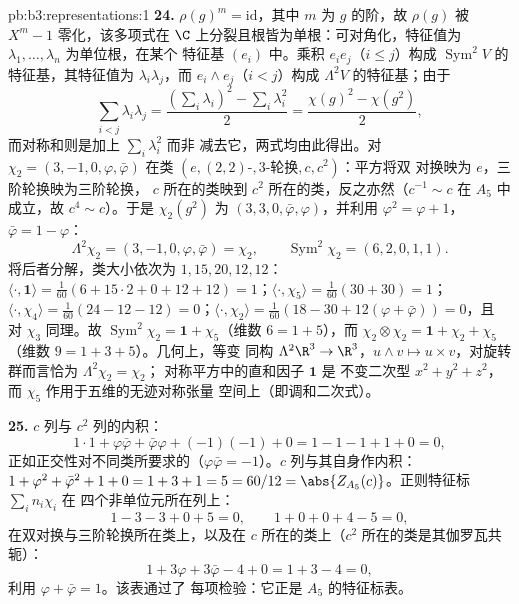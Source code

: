 \begin{solution}{pb:b3:representations:1}
\textbf{24.} $\rho(g)^m = \mathrm{id}$，其中 $m$ 为
$g$ 的阶，故 $\rho(g)$ 被 $X^m - 1$ 零化，该多项式在
$\C$ 上分裂且根皆为单根：可对角化，特征值为
$\lambda_1, \dots, \lambda_n$ 为单位根，在某个
特征基 $(e_i)$ 中。乘积 $e_ie_j$（$i \leq j$）构成
$\operatorname{Sym}^2V$ 的特征基，其特征值为
$\lambda_i\lambda_j$，而 $e_i \wedge e_j$（$i < j$）构成
$\Lambda^2V$ 的特征基；由于
\[
\sum_{i<j}\lambda_i\lambda_j
= \frac{(\sum_i\lambda_i)^2 - \sum_i\lambda_i^2}2
= \frac{\chi(g)^2 - \chi(g^2)}2,
\]
而对称和则是加上 $\sum_i\lambda_i^2$ 而非
减去它，两式均由此得出。对 $\chi_2 = (3, -1,
0, \varphi, \bar\varphi)$ 在类 $(e, (2,2)\text{-},
3\text{-轮换}, c, c^2)$：平方将双
对换映为 $e$，三阶轮换映为三阶轮换，
$c$ 所在的类映到 $c^2$ 所在的类，反之亦然（$c^{-1} \sim
c$ 在 $A_5$ 中成立，故 $c^4 \sim c$）。于是 $\chi_2(g^2)$ 为 $(3,
3, 0, \bar\varphi, \varphi)$，并利用 $\varphi^2 = \varphi
+ 1$，$\bar\varphi = 1 - \varphi$：
\[
\Lambda^2\chi_2 = (3, -1, 0, \varphi, \bar\varphi) = \chi_2,
\qquad
\operatorname{Sym}^2\chi_2 = (6, 2, 0, 1, 1) .
\]
将后者分解，类大小依次为 $1, 15, 20, 12,
12$：$\langle\cdot, \mathbf 1\rangle = \frac1{60}(6 +
15\cdot2 + 0 + 12 + 12) = 1$；$\langle\cdot, \chi_5\rangle =
\frac1{60}(30 + 30) = 1$；$\langle\cdot, \chi_4\rangle =
\frac1{60}(24 - 12 - 12) = 0$；$\langle\cdot, \chi_2\rangle =
\frac1{60}(18 - 30 + 12(\varphi + \bar\varphi)) = 0$，且
对 $\chi_3$ 同理。故 $\operatorname{Sym}^2\chi_2 =
\mathbf 1 + \chi_5$（维数 $6 = 1 + 5$），而
$\chi_2\otimes\chi_2 = \mathbf 1 + \chi_2 + \chi_5$
（维数 $9 = 1 + 3 + 5$）。几何上，等变
同构 $\Lambda^2\R^3 \to \R^3$，$u \wedge v \mapsto u
\times v$，对旋转群而言恰为 $\Lambda^2\chi_2 = \chi_2$；
对称平方中的直和因子 $\mathbf 1$ 是
不变二次型 $x^2 + y^2 + z^2$，而
$\chi_5$ 作用于五维的无迹对称张量
空间上（即调和二次式）。

\textbf{25.} $c$ 列与 $c^2$ 列的内积：
\[
1\cdot1 + \varphi\bar\varphi + \bar\varphi\varphi +
(-1)(-1) + 0 = 1 - 1 - 1 + 1 + 0 = 0,
\]
正如正交性对不同类所要求的（$\varphi
\bar\varphi = -1$）。$c$ 列与其自身作内积：$1 +
\varphi^2 + \bar\varphi^2 + 1 + 0 = 1 + 3 + 1 = 5 = 60/12 =
\abs{Z_{A_5}(c)}$。正则特征标 $\sum_in_i\chi_i$ 在
四个非单位元所在列上：
\[
1 - 3 - 3 + 0 + 5 = 0, \qquad
1 + 0 + 0 + 4 - 5 = 0,
\]
在双对换与三阶轮换所在类上，以及在
$c$ 所在的类上（$c^2$ 所在的类是其伽罗瓦共轭）：
\[
1 + 3\varphi + 3\bar\varphi - 4 + 0 = 1 + 3 - 4 = 0,
\]
利用 $\varphi + \bar\varphi = 1$。该表通过了
每项检验：它正是 $A_5$ 的特征标表。
\end{solution}
